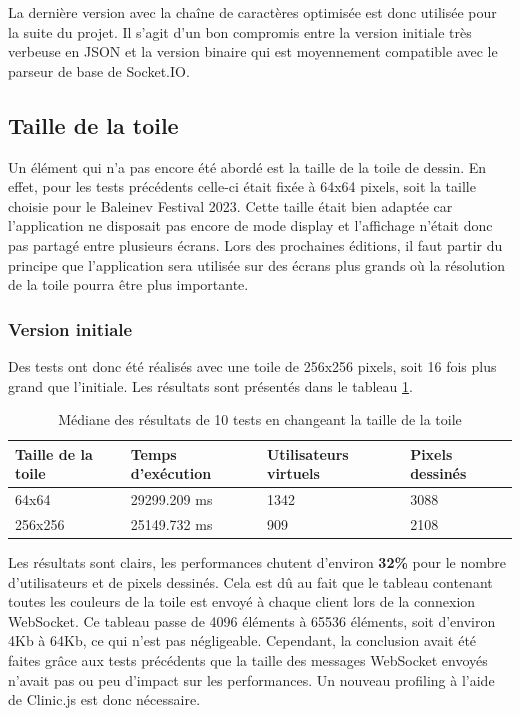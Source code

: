 La dernière version avec la chaîne de caractères optimisée est donc utilisée pour la suite du projet. Il s'agit d'un bon compromis entre la version initiale très verbeuse en JSON et la version binaire qui est moyennement compatible avec le parseur de base de Socket.IO.

\subsection{Taille de la toile}

Un élément qui n'a pas encore été abordé est la taille de la toile de dessin. En effet, pour les tests précédents celle-ci était fixée à 64x64 pixels, soit la taille choisie pour le Baleinev Festival 2023. Cette taille était bien adaptée car l'application ne disposait pas encore de mode display et l'affichage n'était donc pas partagé entre plusieurs écrans. Lors des prochaines éditions, il faut partir du principe que l'application sera utilisée sur des écrans plus grands où la résolution de la toile pourra être plus importante.

\subsubsection{Version initiale}

Des tests ont donc été réalisés avec une toile de 256x256 pixels, soit 16 fois plus grand que l'initiale. Les résultats sont présentés dans le tableau \ref{table:canvas-size-results}.

\begin{table}[H]
  \centering
  \begin{tabular}{|l|l|l|l|}
    \hline
    \textbf{Taille de la toile} & \textbf{Temps d'exécution} & \textbf{Utilisateurs virtuels} & \textbf{Pixels dessinés} \\ \hline
    64x64                       & 29299.209 ms               & 1342                           & 3088                     \\ \hline
    256x256                     & 25149.732 ms               & 909                            & 2108                     \\ \hline
  \end{tabular}
  \caption{Médiane des résultats de 10 tests en changeant la taille de la toile}
  \label{table:canvas-size-results}
\end{table}

Les résultats sont clairs, les performances chutent d'environ \textbf{32\%} pour le nombre d'utilisateurs et de pixels dessinés. Cela est dû au fait que le tableau contenant toutes les couleurs de la toile est envoyé à chaque client lors de la connexion WebSocket. Ce tableau passe de 4096 éléments à 65536 éléments, soit d'environ 4Kb à 64Kb, ce qui n'est pas négligeable. Cependant, la conclusion avait été faites grâce aux tests précédents que la taille des messages WebSocket envoyés n'avait pas ou peu d'impact sur les performances. Un nouveau profiling à l'aide de Clinic.js est donc nécessaire.

